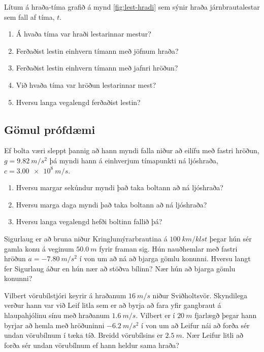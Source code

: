 \ifdefined \wholebook \else\documentclass[oneside]{book}\usepackage{EdlBook}\graphicspath{{figures/}}
\begin{document}
\begin{enumerate}[label = \textbf{Dæmi \thechapter.\arabic*.}]
\begin{minipage}{\linewidth}
\item Lítum á hraða-tíma grafið á mynd \ref{fig:lest-hradi} sem sýnir hraða járnbrautalestar sem fall af tíma, $t$.
\begin{enumerate}[label = \textbf{(\alph*)}]
    \item Á hvaða tíma var hraði lestarinnar mestur?
    \item Ferðaðist lestin einhvern tímann með jöfnum hraða?
    \item Ferðaðist lestin einhvern tímann með jafnri hröðun?
    \item Við hvaða tíma var hröðun lestarinnar mest?
    \item Hversu langa vegalengd ferðaðist lestin?
\end{enumerate}

\end{minipage}


\newpage

\subsection*{Gömul prófdæmi}

\item Ef bolta væri sleppt þannig að hann myndi falla niður að eilífu með fastri hröðun, $g = \SI{9.82}{m/s^2}$ þá myndi hann á einhverjum tímapunkti ná ljóshraða, $c = \SI{3.00e8}{m/s}$.
\begin{enumerate}[label = \textbf{(\alph*)}]
\item Hversu margar sekúndur myndi það taka boltann að ná ljóshraða?
\item Hversu marga daga myndi það taka boltann að ná ljóshraða?
\item Hversu langa vegalengd hefði boltinn fallið þá?
\end{enumerate}

\item Sigurlaug er að bruna niður Kringlumýrarbrautina á $\SI{100}{km/klst}$ þegar hún sér gamla konu á veginum $\SI{50.0}{m}$ fyrir framan sig. Hún nauðhemlar með fastri hröðun $a = -\SI{7.80}{m/s^2}$ í von um að ná að bjarga gömlu konunni. Hversu langt fer Sigurlaug áður en hún nær að stöðva bílinn? Nær hún að bjarga gömlu konunni?

\item Vilbert vörubílstjóri keyrir á hraðanum $\SI{16}{m/s}$ niður Sviðholtsvör. Skyndilega verður hann var við Leif litla sem er að byrja að fara yfir gangbraut á hlaupahjólinu sínu með hraðanum $\SI{1.6}{m/s}$. Vilbert er í $\SI{20}{m}$ fjarlægð þegar hann byrjar að hemla með hröðuninni $\SI{-6.2}{m/s^2}$ í von um að Leifur nái að forða sér undan vörubílnum í tæka tíð. Breidd vörubílsins er $\SI{2.5}{m}$. Nær Leifur litli að forða sér undan vörubílnum ef hann heldur sama hraða?


\end{enumerate}
\end{document}
